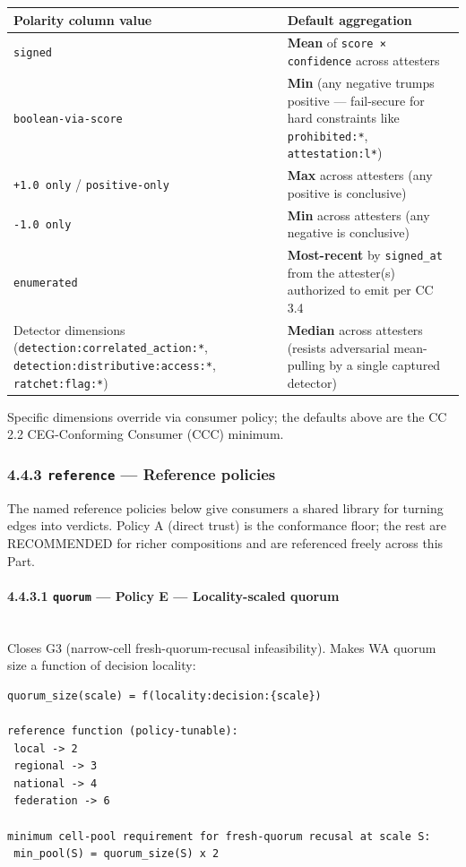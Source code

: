 \documentclass[11pt]{article}
\begin{document}
{\footnotesize
\begin{longtable}{|p{8.0cm}|p{8.0cm}|}\hline
\textbf{Polarity column value} & \textbf{Default aggregation} \\ \hline\endhead
\texttt{signed} & \textbf{Mean} of \texttt{score × confidence} across attesters \\ \hline
\texttt{boolean-via-score} & \textbf{Min} (any negative trumps positive — fail-secure for hard constraints like \texttt{prohibited:*}, \texttt{attestation:l*}) \\ \hline
\texttt{+1.0 only} / \texttt{positive-only} & \textbf{Max} across attesters (any positive is conclusive) \\ \hline
\texttt{-1.0 only} & \textbf{Min} across attesters (any negative is conclusive) \\ \hline
\texttt{enumerated} & \textbf{Most-recent} by \texttt{signed\_at} from the attester(s) authorized to emit per CC 3.4 \\ \hline
Detector dimensions (\texttt{detection:correlated\_action:*}, \texttt{detection:distributive:access:*}, \texttt{ratchet:flag:*}) & \textbf{Median} across attesters (resists adversarial mean-pulling by a single captured detector) \\ \hline
\end{longtable}}


Specific dimensions override via consumer policy; the defaults above are the CC 2.2 CEG-Conforming Consumer (CCC) minimum.


\subsubsection*{4.4.3 \texttt{reference} — Reference policies}


The named reference policies below give consumers a shared library for turning edges into verdicts. Policy A (direct trust) is the conformance floor; the rest are RECOMMENDED for richer compositions and are referenced freely across this Part.


\paragraph{4.4.3.1 \texttt{quorum} — Policy E — Locality-scaled quorum}\mbox{}\\


Closes G3 (narrow-cell fresh-quorum-recusal infeasibility). Makes WA quorum size a function of decision locality:


\begin{lstlisting}
quorum_size(scale) = f(locality:decision:{scale})

reference function (policy-tunable):
 local -> 2
 regional -> 3
 national -> 4
 federation -> 6

minimum cell-pool requirement for fresh-quorum recusal at scale S:
 min_pool(S) = quorum_size(S) x 2
\end{lstlisting}
\end{document}
